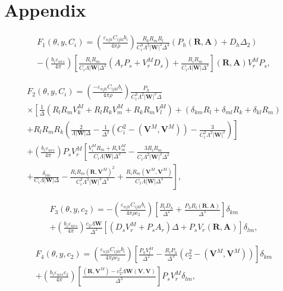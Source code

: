 \documentclass[12pt]{article}
\begin{document}
\section*{Appendix}

\begin{multline}
F_1(\theta,y,C_i) = \left(\frac{\varepsilon_{njh}C_{ijkl}b_i}{4\pi\rho}\right)\frac{R_k R_m R_l}{C_i^3\Lambda^2|\mathbf{W}|^2\Delta^3}(P_h(\mathbf{R},\mathbf{A}) + D_h\Delta_2) \\
- \left(\frac{b_i\varepsilon_{nrs}}{4\pi}\right)\left[\frac{R_i R_m}{C_i\Lambda|\mathbf{W}|\Delta^2}(A_r P_s + V_r^M D_s) + \frac{R_i R_m}{C_i\Lambda|\mathbf{W}|\Delta^3}\right](\mathbf{R},\mathbf{A})V_r^M P_s,
\end{multline}

\begin{multline}
F_2(\theta,y,C_i) = \left(\frac{-\varepsilon_{njh}C_{ijkl}b_i}{4\pi\rho}\right)\frac{P_h}{C_i^3\Lambda^2|\mathbf{W}|^2\Delta} \\
\times \left[\frac{1}{\Delta}(R_l R_m V_k^M + R_l R_k V_m^M + R_k R_m V_l^M) + (\delta_{km}R_l + \delta_{ml}R_k + \delta_{kl}R_m) \right. \\
\left. + R_l R_m R_k\left(\frac{2}{\Lambda|\mathbf{W}|\Delta} - \frac{1}{\Delta^2}(C_i^2 - (\mathbf{V}^M,\mathbf{V}^M)) - \frac{3}{C_i^2\Lambda^2|\mathbf{W}|^2}\right)\right] \\
+ \left(\frac{b_i\varepsilon_{nrs}}{4\pi}\right)P_s V_r^M\left[\frac{V_i^M R_m + R_i V_m^M}{C_i\Lambda|\mathbf{W}|\Delta^2}
 - \frac{3R_i R_m}{C_i\Lambda^2|\mathbf{W}|^2\Delta^2}\right. \\
\left.
     + \frac{\delta_{im}}{C_i\Lambda|\mathbf{W}|\Delta}
 - \frac{R_i R_m(\mathbf{R},\mathbf{V}^M)^2}{C_i^3\Lambda^3|\mathbf{W}|^3\Delta^3}
 + \frac{R_i R_m(\mathbf{V}^M,\mathbf{V}^M)}{C_1\Lambda|\mathbf{W}|\Delta^3}\right],
\end{multline}

\begin{multline}
F_3(\theta,y,c_2) = -\left(\frac{\varepsilon_{njh}C_{ijkl}b_i}{4\pi\rho c_2}\right)\left[\frac{R_l D_h}{\Delta^2} + \frac{P_h R_l(\mathbf{R},\mathbf{A})}{\Delta^3}\right]\delta_{km} \\
+ \left(\frac{b_i\varepsilon_{nrs}}{4\pi}\right)\frac{c_2\Lambda\mathbf{W}}{\Delta^3}\left[(D_s V_r^M + P_s A_r)\Delta + P_s V_r(\mathbf{R},\mathbf{A})\right]\delta_{lm},
\end{multline}

\begin{multline}
F_4(\theta,y,c_2) = \left(\frac{\varepsilon_{njh}C_{ijkl}b_i}{4\pi\rho c_2}\right)\left[\frac{P_h V_l^M}{\Delta^2} - \frac{R_l P_h}{\Delta^3}(c_2^2 - (\mathbf{V}^M,\mathbf{V}^M))\right]\delta_{km} \\
+ \left(\frac{b_i\varepsilon_{nrs}c_2}{4\pi}\right)\left[\frac{(\mathbf{R},\mathbf{V}^M) - c_2^2\Lambda\mathbf{W}(\mathbf{V},\mathbf{V})}{\Delta^3}\right]P_s V_r^M\delta_{lm},
\end{multline}
\end{document}
